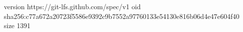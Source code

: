 version https://git-lfs.github.com/spec/v1
oid sha256:c77a672a20723f5586e9392c9b7552a97760133e54130e816b06d4e47e604f40
size 1391
